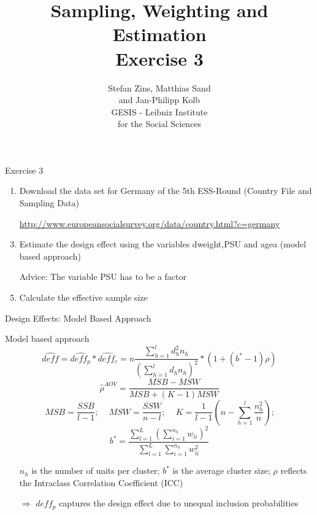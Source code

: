 \documentclass[11pt,german,hideothersubsections]{beamer}\usepackage[]{graphicx}\usepackage[]{color}
\title[Day 3]{Sampling, Weighting and Estimation\\ \Large{Exercise 3} }
\author[M. Sand]{Stefan Zins, Matthias Sand\\ and Jan-Philipp Kolb\\ \vspace{.5cm} \footnotesize{GESIS - Leibniz Institute\\ for the Social Sciences}}
\begin{document}
\maketitle



\begin{frame}[fragile]{Exercise 3}

\begin{enumerate}

\item Download the data set for Germany of the 5th ESS-Round (Country File and Sampling Data)
\item[] \url{http://www.europeansocialsurvey.org/data/country.html?c=germany}
\item Estimate the design effect using the variables \alert{dweight},\alert{PSU} and \alert{agea} (model based approach) 
\item[] \alert{Advice:} The variable \alert{PSU} has to be a factor
\item Calculate the effective sample size
 

\end{enumerate}


\end{frame}
\begin{frame}[fragile]{Design Effects: Model Based Approach}
\footnotesize{
\begin{block}{Model based approach}
\begin{equation*}
\hat{deff}=\hat{deff_p} * \hat{deff_c} = n\frac{\sum_{h=1}^ld_h^2 n_h}{(\sum_{h=1}^ld_h n_h)^2}*(1+(b^{*}-1)\rho)
\end{equation*}
\begin{equation*}
\hat{\rho}^{AOV}=\frac{MSB-MSW}{MSB+(K-1)MSW}
\end{equation*}
\begin{equation*}
MSB=\frac{SSB}{l-1}\text{;~~~~}MSW=\frac{SSW}{n-l}\text{;~~~~}K=\frac{1}{l-1}(n-\sum_{h=1}^l\frac{n_h^2}{n})\text{;}
\end{equation*}
\begin{equation*}
b^{*}=\frac{\sum_{l=1}^{L}(\sum_{i=1}^{n_h}w_{li})^2}{\sum_{l=1}^{L}\sum_{i=1}^{n_h}w_{li}^2}
\end{equation*}
\end{block}

\begin{itemize}
\item[] \alert{$n_h$} is the number of units per cluster; \alert{$b^{*}$} is the average cluster size; \alert{$\rho$} reflects the Intraclass Correlation Coefficient (ICC)
\item[$\Rightarrow$] $deff_p$ captures the design effect due to unequal inclusion probabilities
\end{itemize}
}
\end{frame}
\end{document}
